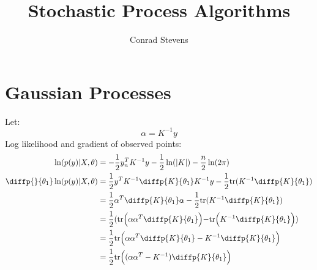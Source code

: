 \documentclass[]{article}
\title{Stochastic Process Algorithms}
\author{Conrad Stevens}
\begin{document}
\maketitle


\section{Gaussian Processes}
Let:
\begin{equation}
	\alpha = K^{-1}y
\end{equation}
Log likelihood and gradient of observed points:
\begin{equation}
	\begin{aligned}
		\ln(p(y) | X, \theta) &= -\frac{1}{2}y^T_n K^{-1} y - \frac{1}{2}\ln(|K|) - \frac{n}{2}\ln(2\pi)\\
		\diffp{}{{\theta_1}}\ln(p(y) | X, \theta) &= \frac{1}{2}y^TK^{-1} \diffp{K}{{\theta_1}} K^{-1} y - \frac{1}{2}\text{tr}(K^{-1} \diffp{K}{{\theta_1}}) \\
		&= \frac{1}{2} \alpha^T \diffp{K}{{\theta_1}} \alpha - \frac{1}{2}\text{tr}(K^{-1} \diffp{K}{{\theta_1}}) \\
		&= \frac{1}{2}(\text{tr}\Bigl(\alpha\alpha^T\diffp{K}{{\theta_1}} \Bigl) - \text{tr}\Bigl(K^{-1} \diffp{K}{{\theta_1}}\Bigl))\\
		&= \frac{1}{2}\text{tr}\Bigl(\alpha\alpha^T\diffp{K}{{\theta_1}} - K^{-1} \diffp{K}{{\theta_1}}\Bigl) \\
		&= \frac{1}{2} \text{tr} \Bigl( (\alpha \alpha^T - K^{-1}) \diffp{K}{{\theta_1}} \Bigl) \\
	\end{aligned}
\end{equation}
\end{document}

